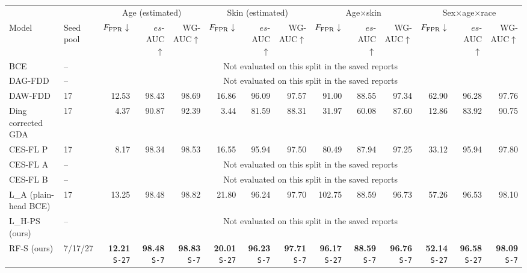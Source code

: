 \documentclass[10pt]{article}
\begin{document}
{\fontsize{7.6}{9.1}\selectfont\setlength{\tabcolsep}{3pt}
\renewcommand{\arraystretch}{1.05}
\begin{tabular*}{\linewidth}{@{\extracolsep{\fill}}llrrrrrrrrrrrr}\toprule
 & & \multicolumn{3}{c}{Age (estimated)} & \multicolumn{3}{c}{Skin (estimated)} & \multicolumn{3}{c}{Age$\times$skin} & \multicolumn{3}{c}{Sex$\times$age$\times$race}\\
Model & Seed pool & $F_{\rm FPR}\downarrow$ & $es$-AUC$\uparrow$ & WG-AUC$\uparrow$ & $F_{\rm FPR}\downarrow$ & $es$-AUC$\uparrow$ & WG-AUC$\uparrow$ & $F_{\rm FPR}\downarrow$ & $es$-AUC$\uparrow$ & WG-AUC$\uparrow$ & $F_{\rm FPR}\downarrow$ & $es$-AUC$\uparrow$ & WG-AUC$\uparrow$\\\midrule
BCE & -- & \multicolumn{12}{c}{Not evaluated on this split in the saved reports}\\
DAG-FDD & -- & \multicolumn{12}{c}{Not evaluated on this split in the saved reports}\\
DAW-FDD & 17 & 12.53 & 98.43 & 98.69 & 16.86 & 96.09 & 97.57 & 91.00 & 88.55 & 97.34 & 62.90 & 96.28 & 97.76\\
Ding corrected GDA & 17 & 4.37 & 90.87 & 92.39 & 3.44 & 81.59 & 88.31 & 31.97 & 60.08 & 87.60 & 12.86 & 83.92 & 90.75\\
CES-FL P & 17 & 8.17 & 98.34 & 98.53 & 16.55 & 95.94 & 97.50 & 80.49 & 87.94 & 97.25 & 33.12 & 95.94 & 97.80\\
CES-FL A & -- & \multicolumn{12}{c}{Not evaluated on this split in the saved reports}\\
CES-FL B & -- & \multicolumn{12}{c}{Not evaluated on this split in the saved reports}\\
L\_A (plain-head BCE) & 17 & 13.25 & 98.48 & 98.82 & 21.80 & 96.24 & 97.70 & 102.75 & 88.59 & 96.73 & 57.26 & 96.53 & 98.10\\
L\_H-PS (ours) & -- & \multicolumn{12}{c}{Not evaluated on this split in the saved reports}\\
RF-S (ours) & 7/17/27 & \shortstack{\textbf{12.21}\\{\tiny\texttt{S-27}}} & \shortstack{\textbf{98.48}\\{\tiny\texttt{S-7}}} & \shortstack{\textbf{98.83}\\{\tiny\texttt{S-7}}} & \shortstack{\textbf{20.01}\\{\tiny\texttt{S-27}}} & \shortstack{\textbf{96.23}\\{\tiny\texttt{S-7}}} & \shortstack{\textbf{97.71}\\{\tiny\texttt{S-7}}} & \shortstack{\textbf{96.17}\\{\tiny\texttt{S-27}}} & \shortstack{\textbf{88.59}\\{\tiny\texttt{S-7}}} & \shortstack{\textbf{96.76}\\{\tiny\texttt{S-7}}} & \shortstack{\textbf{52.14}\\{\tiny\texttt{S-27}}} & \shortstack{\textbf{96.58}\\{\tiny\texttt{S-27}}} & \shortstack{\textbf{98.09}\\{\tiny\texttt{S-7}}}\\

\end{tabular*}}
\end{document}
